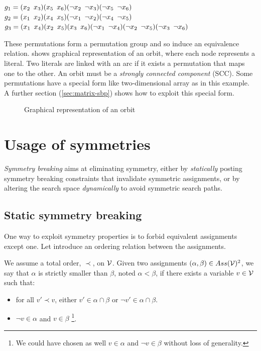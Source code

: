 \begin{center}
 \begin{minipage}[c]{.635\textwidth}
  $g_1 = (x_2 \enskip x_3)(x_5 \enskip x_6)(\neg x_2 \enskip \neg x_3)(\neg x_5 \enskip \neg x_6)$\\
  $g_2 = (x_1 \enskip x_2)(x_4 \enskip x_5)(\neg x_1 \enskip \neg x_2)(\neg x_4 \enskip \neg x_5)$\\
  $g_3 = (x_1 \enskip x_4)(x_2 \enskip x_5)(x_3 \enskip x_6)(\neg x_1 \enskip \neg x_4)(\neg x_2 \enskip \neg x_5)(\neg x_3 \enskip \neg x_6)$
 \end{minipage}
\end{center}

These permutations form a permutation group and so induce an equivalence relation.
 shows graphical representation of an orbit, where each node represents a literal. Two literals are linked with an arc if it exists a permutation that maps one to the other. 
An orbit must be a \emph{strongly connected component} (SCC).  
Some permutations have a special form like two-dimensional
array as in this example.
 A further section (\ref{sec:matrix-sbp}) shows how to exploit this special form.
\begin{figure}[!htbp]
 
 \caption{Graphical representation of an orbit}
 \label{fig:orbit}
\end{figure}

\section{Usage of symmetries}
\emph{Symmetry breaking} aims at eliminating symmetry, either
by \emph{statically} posting symmetry breaking constraints that invalidate symmetric
assignments, or by altering the search space \emph{dynamically} to avoid symmetric search paths.

\subsection{Static symmetry breaking}
One way to exploit symmetry properties is to forbid equivalent assignments except one.
Let introduce an ordering relation between the assignments.
\begin{definition}
 \label{def:assignment_ordering}
 We assume a total order, $\prec$, on $\mathcal{V}$.  Given two assignments $(\alpha,\beta) \in Ass(\mathcal{V})^2 $, 
 we say that $\alpha$ is strictly smaller than $\beta$, noted $\alpha < \beta$, if there exists a variable $v \in \mathcal{V}$
 such that:
 \begin{itemize}
  \item for all $v' \prec v$, either $v' \in \alpha \cap \beta$ or $\neg v' \in \alpha \cap
  \beta$.
  \item $\neg v \in \alpha$ and $v \in \beta$ \footnote{We could have chosen as well 
   $v \in \alpha$ and $\neg v \in \beta$ without loss of generality.}.
 \end{itemize}
\end{definition}

